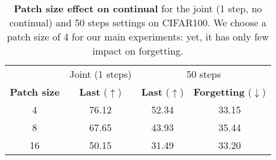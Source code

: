 \begin{table}[t]
    \centering
    \begin{tabular}{@{}c|c|cc@{}}
        \hline
                            & Joint (1 steps)            & \multicolumn{2}{c}{50 steps}                                             \\
        \textbf{Patch size} & \textbf{Last} ($\uparrow$) & \textbf{Last} ($\uparrow$)   & \textbf{Forgetting} ($\downarrow$)\Bstrut \\
        \hline
        4                   & 76.12                      & 52.34                        & 33.15\Tstrut                              \\
        8                   & 67.65                      & 43.93                        & 35.44                                     \\
        16                  & 50.15                      & 31.49                        & 33.20                                     \\
        \hline
    \end{tabular}
    \caption{\textbf{Patch size effect on continual} for the joint (1 step, no continual) and 50
        steps settings on CIFAR100. We choose a patch size of 4 for our main experiments: yet, it
        has only few impact on forgetting.}
    \label{tab:dytox_patch_size}
\end{table}
